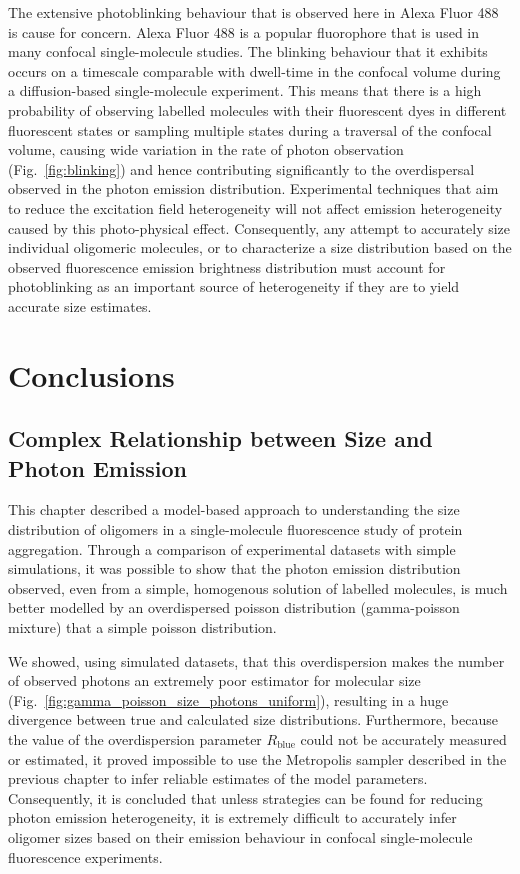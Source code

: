 The extensive photoblinking behaviour that is observed here in Alexa Fluor 488 is cause for concern. Alexa Fluor 488 is a popular fluorophore that is used in many confocal single-molecule studies. The blinking behaviour that it exhibits occurs on a timescale comparable with dwell-time in the confocal volume during a diffusion-based single-molecule experiment. This means that there is a high probability of observing labelled molecules with their fluorescent dyes in different fluorescent states or sampling multiple states during a traversal of the confocal volume, causing wide variation in the rate of photon observation (Fig.~\ref{fig:blinking}) and hence contributing significantly to the overdispersal observed in the photon emission distribution. Experimental techniques that aim to reduce the excitation field heterogeneity will not affect emission heterogeneity caused by this photo-physical effect. Consequently, any attempt to accurately size individual oligomeric molecules, or to characterize a size distribution based on the observed fluorescence emission brightness distribution must account for photoblinking as an important source of heterogeneity if they are to yield accurate size estimates.      

\section{Conclusions}
\subsection{Complex Relationship between Size and Photon Emission}
This chapter described a model-based approach to understanding the size distribution of oligomers in a single-molecule fluorescence study of protein aggregation. Through a comparison of experimental datasets with simple simulations, it was possible to show that the photon emission distribution observed, even from a simple, homogenous solution of labelled molecules, is much better modelled by an overdispersed poisson distribution (gamma-poisson mixture) that a simple poisson distribution.

We showed, using simulated datasets, that this overdispersion makes the number of observed photons an extremely poor estimator for molecular size (Fig.~\ref{fig:gamma_poisson_size_photons_uniform}), resulting in a huge divergence between true and calculated size distributions. Furthermore, because the value of the overdispersion parameter $R_{\text{blue}}$ could not be accurately measured or estimated, it proved impossible to use the Metropolis sampler described in the previous chapter to infer reliable estimates of the model parameters. Consequently, it is concluded that unless strategies can be found for reducing photon emission heterogeneity, it is extremely difficult to accurately infer oligomer sizes based on their emission behaviour in confocal single-molecule fluorescence experiments.


